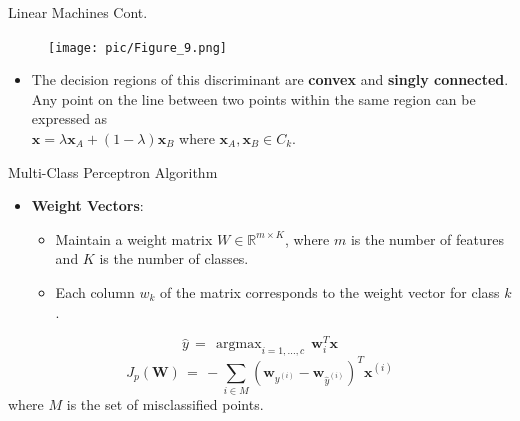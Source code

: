 \documentclass[serif, aspectratio=169]{beamer}
\DeclareMathOperator*{\argmax}{argmax}
\begin{document}
    \begin{frame}{Linear Machines Cont.}
        \begin{center}
            \begin{figure}
                \texttt{[image: pic/Figure\_9.png]}
            \end{figure}
            \endminipage
        \end{center}
        \hspace{4cm}
        \begin{itemize}\itemsep1.5em
        \item \justifying The decision regions of this discriminant are \textbf{convex} and \textbf{singly connected}. Any point on the line between two points within the same region can be expressed as \\
        \(
        \mathbf{x} = \lambda \mathbf{x}_A + (1 - \lambda) \mathbf{x}_B
        \)
        where \( \mathbf{x}_A, \mathbf{x}_B \in C_k \).

        \end{itemize}
    \end{frame}

    \begin{frame}{Multi-Class Perceptron Algorithm}
        \begin{itemize}
            \item \textbf{Weight Vectors}:
            \medskip
            \begin{itemize}\itemsep.8em
            \item Maintain a weight matrix \( W \in \mathbb{R}^{m \times K} \), where \( m \) is the number of features and \( K \) is the number of classes.
            \item Each column \( w_k \) of the matrix corresponds to the weight vector for class \( k \).
            \end{itemize}
        \end{itemize}
        \hspace{4cm}
        \[
            \hat{y} \, = \, \argmax_{i=1,...,c} \, \mathbf{w}_i^T \mathbf{x}
        \]
        \[
            J_p(\mathbf{W}) \, = \, - \sum_{i \in M}(\mathbf{w}_{y^{(i)}} - \mathbf{w}_{\hat{y}^{(i)}})^T\mathbf{x}^{(i)}
        \]
        where \( M \) is the set of misclassified points.
    \end{frame}
\end{document}
